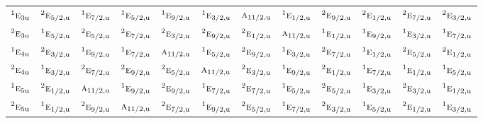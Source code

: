 \documentclass[10pt,a4paper]{article}
\numberwithin{equation}{section}
\newcommand{\irr}[1]{\text{\normalfont\scshape #1}}
\newcommand{\conjpair}[1]{{}^{#1}}
\newcommand{\ptag}[1]{\mathrm{#1}}
\begin{document}
{\begin{longtable}{@{}lccccccccccc@{}}
$\conjpair{1}\irr{e}_{3\ptag{u}}$ & $\conjpair{2}\irr{e}_{5/2,\ptag{u}}$ & $\conjpair{1}\irr{e}_{7/2,\ptag{u}}$ & $\conjpair{1}\irr{e}_{5/2,\ptag{u}}$ & $\conjpair{1}\irr{e}_{9/2,\ptag{u}}$ & $\conjpair{1}\irr{e}_{3/2,\ptag{u}}$ & $\irr{a}_{11/2,\ptag{u}}$ & $\conjpair{1}\irr{e}_{1/2,\ptag{u}}$ & $\conjpair{2}\irr{e}_{9/2,\ptag{u}}$ & $\conjpair{2}\irr{e}_{1/2,\ptag{u}}$ & $\conjpair{2}\irr{e}_{7/2,\ptag{u}}$ & $\conjpair{2}\irr{e}_{3/2,\ptag{u}}$\\
$\conjpair{2}\irr{e}_{3\ptag{u}}$ & $\conjpair{1}\irr{e}_{5/2,\ptag{u}}$ & $\conjpair{2}\irr{e}_{5/2,\ptag{u}}$ & $\conjpair{2}\irr{e}_{7/2,\ptag{u}}$ & $\conjpair{2}\irr{e}_{3/2,\ptag{u}}$ & $\conjpair{2}\irr{e}_{9/2,\ptag{u}}$ & $\conjpair{2}\irr{e}_{1/2,\ptag{u}}$ & $\irr{a}_{11/2,\ptag{u}}$ & $\conjpair{1}\irr{e}_{1/2,\ptag{u}}$ & $\conjpair{1}\irr{e}_{9/2,\ptag{u}}$ & $\conjpair{1}\irr{e}_{3/2,\ptag{u}}$ & $\conjpair{1}\irr{e}_{7/2,\ptag{u}}$\\
$\conjpair{1}\irr{e}_{4\ptag{u}}$ & $\conjpair{2}\irr{e}_{3/2,\ptag{u}}$ & $\conjpair{1}\irr{e}_{9/2,\ptag{u}}$ & $\conjpair{1}\irr{e}_{7/2,\ptag{u}}$ & $\irr{a}_{11/2,\ptag{u}}$ & $\conjpair{1}\irr{e}_{5/2,\ptag{u}}$ & $\conjpair{2}\irr{e}_{9/2,\ptag{u}}$ & $\conjpair{1}\irr{e}_{3/2,\ptag{u}}$ & $\conjpair{2}\irr{e}_{7/2,\ptag{u}}$ & $\conjpair{1}\irr{e}_{1/2,\ptag{u}}$ & $\conjpair{2}\irr{e}_{5/2,\ptag{u}}$ & $\conjpair{2}\irr{e}_{1/2,\ptag{u}}$\\
$\conjpair{2}\irr{e}_{4\ptag{u}}$ & $\conjpair{1}\irr{e}_{3/2,\ptag{u}}$ & $\conjpair{2}\irr{e}_{7/2,\ptag{u}}$ & $\conjpair{2}\irr{e}_{9/2,\ptag{u}}$ & $\conjpair{2}\irr{e}_{5/2,\ptag{u}}$ & $\irr{a}_{11/2,\ptag{u}}$ & $\conjpair{2}\irr{e}_{3/2,\ptag{u}}$ & $\conjpair{1}\irr{e}_{9/2,\ptag{u}}$ & $\conjpair{2}\irr{e}_{1/2,\ptag{u}}$ & $\conjpair{1}\irr{e}_{7/2,\ptag{u}}$ & $\conjpair{1}\irr{e}_{1/2,\ptag{u}}$ & $\conjpair{1}\irr{e}_{5/2,\ptag{u}}$\\
$\conjpair{1}\irr{e}_{5\ptag{u}}$ & $\conjpair{2}\irr{e}_{1/2,\ptag{u}}$ & $\irr{a}_{11/2,\ptag{u}}$ & $\conjpair{1}\irr{e}_{9/2,\ptag{u}}$ & $\conjpair{2}\irr{e}_{9/2,\ptag{u}}$ & $\conjpair{1}\irr{e}_{7/2,\ptag{u}}$ & $\conjpair{2}\irr{e}_{7/2,\ptag{u}}$ & $\conjpair{1}\irr{e}_{5/2,\ptag{u}}$ & $\conjpair{2}\irr{e}_{5/2,\ptag{u}}$ & $\conjpair{1}\irr{e}_{3/2,\ptag{u}}$ & $\conjpair{2}\irr{e}_{3/2,\ptag{u}}$ & $\conjpair{1}\irr{e}_{1/2,\ptag{u}}$\\
$\conjpair{2}\irr{e}_{5\ptag{u}}$ & $\conjpair{1}\irr{e}_{1/2,\ptag{u}}$ & $\conjpair{2}\irr{e}_{9/2,\ptag{u}}$ & $\irr{a}_{11/2,\ptag{u}}$ & $\conjpair{2}\irr{e}_{7/2,\ptag{u}}$ & $\conjpair{1}\irr{e}_{9/2,\ptag{u}}$ & $\conjpair{2}\irr{e}_{5/2,\ptag{u}}$ & $\conjpair{1}\irr{e}_{7/2,\ptag{u}}$ & $\conjpair{2}\irr{e}_{3/2,\ptag{u}}$ & $\conjpair{1}\irr{e}_{5/2,\ptag{u}}$ & $\conjpair{2}\irr{e}_{1/2,\ptag{u}}$ & $\conjpair{1}\irr{e}_{3/2,\ptag{u}}$\\

\end{longtable}}
\end{document}
